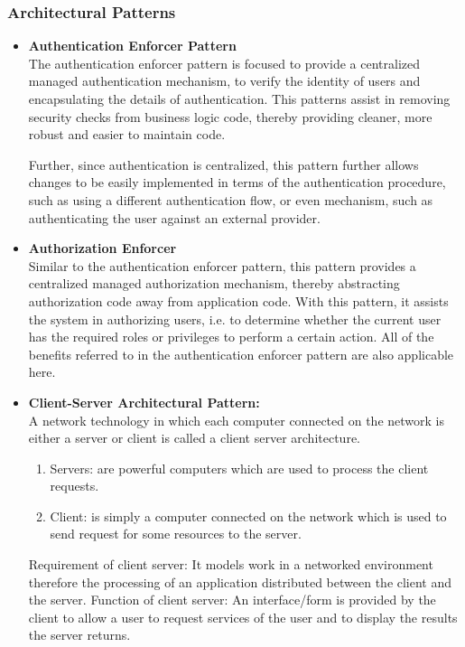 \documentclass[a4paper,10pt]{article}
\begin{document}
\subsubsection{Architectural Patterns}
	\begin{itemize}
		\item \textbf{Authentication Enforcer Pattern} \\
		The authentication enforcer pattern is focused to provide a centralized managed authentication mechanism, to verify the identity of users and encapsulating the details of authentication. This patterns assist in removing security checks from business logic code, thereby providing cleaner, more robust and easier to maintain code.
		
		Further, since authentication is centralized, this pattern further allows changes to be easily implemented in terms of the authentication procedure, such as using a different authentication flow, or even mechanism, such as authenticating the user against an external provider.
	
		\item \textbf{Authorization Enforcer} \\
		Similar to the authentication enforcer pattern, this pattern provides a centralized managed authorization mechanism, thereby abstracting authorization code away from application code.  With this pattern, it assists the system in authorizing users, i.e. to determine whether the current user has the required roles or privileges to perform a certain action. All of the benefits referred to in the authentication enforcer pattern are also applicable here.
	
		\item \textbf{Client-Server Architectural Pattern:}\\
			A network technology in which each computer connected on the network is either a server or client is called a client server architecture.
			\begin{enumerate}
				\item Servers: are powerful computers which are used to process the client requests.
				\item Client: is simply a computer connected on the network which is used to send request for some resources to the server.
			\end{enumerate}
			Requirement of client server: It models work in a networked environment therefore the processing of an application distributed between the client and the server.
			Function of client server: An interface/form is provided by the client to allow a user to request services of the user and to display the results the server returns.
			

\end{itemize}
\end{document}
